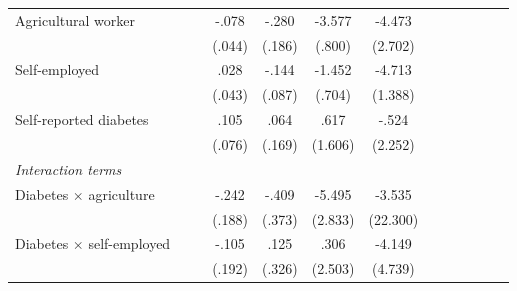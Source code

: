 \documentclass[12pt,english]{article}
\begin{document}
\begin{table}[p]
\begin{center}
\begin{adjustbox}{max width=\linewidth}
\begin{threeparttable}
{\begin{tabular}{l*{6}{S
								S}}
						Agricultural worker&         &         &    -.078\sym{*}  &    -.280         &   -3.577\sym{***}&   -4.473\sym{*}  \\
						&         &         &   (.044)         &   (.186)         &   (.800)         &  (2.702)         \\
						Self-employed   &         &         &     .028         &    -.144\sym{*}  &   -1.452\sym{**} &   -4.713\sym{***}\\
						&         &         &   (.043)         &   (.087)         &   (.704)         &  (1.388)         \\
						Self-reported diabetes&         &         &     .105         &     .064         &     .617         &    -.524         \\
						&         &         &   (.076)         &   (.169)         &  (1.606)         &  (2.252)         \\
						\textit{Interaction terms} &&&&&&\\                
						\hspace*{5mm}Diabetes $\times$ agriculture&         &         &    -.242         &    -.409         &   -5.495\sym{*}  &   -3.535         \\
						&         &         &   (.188)         &   (.373)         &  (2.833)         & (22.300)         \\
						\hspace*{5mm}Diabetes $\times$ self-employed&         &         &    -.105         &     .125         &     .306         &   -4.149         \\
						&         &         &   (.192)         &   (.326)         &  (2.503)         &  (4.739)         \\


\end{tabular}}
\end{threeparttable}
\end{adjustbox}
\end{center}
\end{table}
\end{document}
